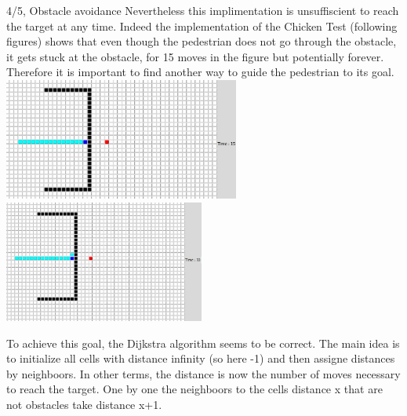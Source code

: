 \documentclass[10pt,a4paper]{article}
\begin{document}
\begin{task}{4/5, Obstacle avoidance}
Nevertheless this implimentation is unsuffiscient to reach the target at any time. Indeed the implementation of the Chicken Test (following figures) shows that even though the pedestrian does not go through the obstacle, it gets stuck at the obstacle, for 15 moves in the figure but potentially forever. Therefore it is important to find another way to guide the pedestrian to its goal. \newline \newline
\includegraphics[height=4cm]{chicken_fail_arrival}
~~~
\includegraphics[height=4cm]{chicken_fail_blocked}
\newline \newline

To achieve this goal, the Dijkstra algorithm seems to be correct. The main idea is to initialize all cells with distance infinity (so here -1) and then assigne distances by neighboors.
In other terms, the distance is now the number of moves necessary to reach the target. One by one the neighboors to the cells distance x that are not obstacles take distance x+1. \newline \newline \newline


\end{task}
\end{document}
